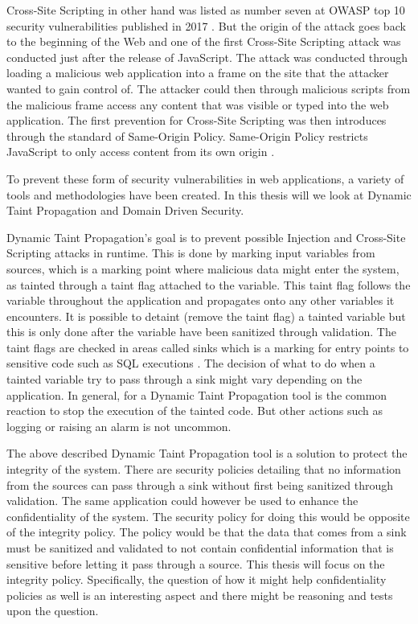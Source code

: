 \documentclass{../kththesis}
\begin{document}
Cross-Site Scripting in other hand was listed as number seven at OWASP top 10 security vulnerabilities published in 2017 \parencite{OWASP2017}. But the origin of the attack goes back to the beginning of the Web and one of the first Cross-Site Scripting attack was conducted just after the release of JavaScript. The attack was conducted through loading a malicious web application into a frame on the site that the attacker wanted to gain control of. The attacker could then through malicious scripts from the malicious frame access any content that was visible or typed into the web application. The first prevention for Cross-Site Scripting was then introduces through the standard of Same-Origin Policy. Same-Origin Policy restricts JavaScript to only access content from its own origin \parencite{FogieSeth2007Xacs, w3csop}.

To prevent these form of security vulnerabilities in web applications, a variety of tools and methodologies have been created. In this thesis will we look at Dynamic Taint Propagation and Domain Driven Security. 

Dynamic Taint Propagation’s goal is to prevent possible Injection and Cross-Site Scripting attacks in runtime. This is done by marking input variables from sources, which is a marking point where malicious data might enter the system, as tainted through a taint flag attached to the variable. This taint flag follows the variable throughout the application and propagates onto any other variables it encounters. It is possible to detaint (remove the taint flag) a tainted variable but this is only done after the variable have been sanitized through validation. The taint flags are checked in areas called sinks which is a marking for entry points to sensitive code such as SQL executions \parencite{Pan2015, Venkataramani2008}. The decision of what to do when a tainted variable try to pass through a sink might vary depending on the application. In general, for a Dynamic Taint Propagation tool is the common reaction to stop the execution of the tainted code. But other actions such as logging or raising an alarm is not uncommon. 

The above described Dynamic Taint Propagation tool is a solution to protect the integrity of the system. There are security policies detailing that no information from the sources can pass through a sink without first being sanitized through validation. The same application could however be used to enhance the confidentiality of the system. The security policy for doing this would be opposite of the integrity policy. The policy would be that the data that comes from a sink must be sanitized and validated to not contain confidential information that is sensitive before letting it pass through a source. This thesis will focus on the integrity policy. Specifically, the question of how it might help confidentiality policies as well is an interesting aspect and there might be reasoning and tests upon the question.
\end{document}
